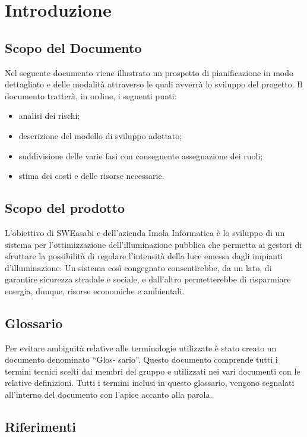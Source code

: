 \chapter{Introduzione}

\section{Scopo del Documento}
Nel seguente documento viene illustrato un prospetto di pianificazione in modo dettagliato e delle modalità attraverso le quali avverrà lo sviluppo del progetto. Il documento tratterà, in ordine, i seguenti punti:
\begin{itemize}
    \item analisi dei rischi;
    \item descrizione del modello di sviluppo adottato;
    \item suddivisione delle varie fasi con conseguente assegnazione dei ruoli;
    \item stima dei costi e delle risorse necessarie.
\end{itemize}

\section{Scopo del prodotto}
L'obiettivo di SWEasabi e dell'azienda Imola Informatica è lo sviluppo di un sistema per l'ottimizzazione dell'illuminazione pubblica che permetta ai gestori di sfruttare la possibilità di regolare l'intensità della luce emessa dagli impianti d'illuminazione. Un sistema così congegnato consentirebbe, da un lato, di garantire sicurezza stradale e sociale, e dall'altro permetterebbe di risparmiare energia, dunque, risorse economiche e ambientali.


\section{Glossario}
Per evitare ambiguità relative alle terminologie utilizzate è stato creato un documento denominato “Glos-
sario”. Questo documento comprende tutti i termini tecnici scelti dai membri del gruppo e utilizzati nei
vari documenti con le relative definizioni. Tutti i termini inclusi in questo glossario, vengono segnalati
all'interno del documento con l'apice accanto alla parola.

\section{Riferimenti}

